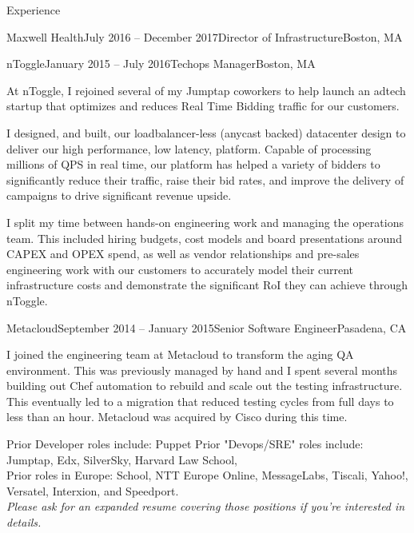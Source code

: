 \documentclass{resume} %
\begin{document}
\begin{rSection}{Experience}
\begin{rSubsection}{Maxwell Health}{July 2016 -- December 2017}{Director of Infrastructure}{Boston, MA}
\end{rSubsection}

\begin{rSubsection}{nToggle}{January 2015 -- July 2016}{Techops Manager}{Boston, MA}

\item[] At nToggle, I rejoined several of my Jumptap coworkers to help launch
  an adtech startup that optimizes and reduces Real Time Bidding traffic for
  our customers.

I designed, and built, our loadbalancer-less (anycast backed) datacenter design
  to deliver our high performance, low latency, platform.  Capable of
  processing millions of QPS in real time, our platform has helped a variety of
  bidders to significantly reduce their traffic, raise their bid rates, and
  improve the delivery of campaigns to drive significant revenue upside.  

I split my time between hands-on engineering work and managing the operations
  team.  This included hiring budgets, cost models and board presentations
  around CAPEX and OPEX spend, as well as vendor relationships and pre-sales
  engineering work with our customers to accurately model their current
  infrastructure costs and demonstrate the significant RoI they can achieve
  through nToggle.

\end{rSubsection}

\begin{rSubsection}{Metacloud}{September 2014 -- January 2015}{Senior Software Engineer}{Pasadena, CA}

\item[] I joined the engineering team at Metacloud to transform the aging QA
  environment.  This was previously managed by hand and I spent several months
  building out Chef automation to rebuild and scale out the testing
  infrastructure.  This eventually led to a migration that reduced testing
  cycles from full days to less than an hour.  Metacloud was acquired by Cisco
  during this time.

\end{rSubsection}

\begin{center}
Prior Developer roles include: Puppet
Prior "Devops/SRE" roles include: Jumptap, Edx, SilverSky, Harvard Law School,\\
Prior roles in Europe: School, NTT Europe Online, MessageLabs, Tiscali, Yahoo!, Versatel, Interxion, and Speedport.\\
\textit{Please ask for an expanded resume covering those positions if you're interested in details.}
\end{center}

\end{rSection}
\end{document}
